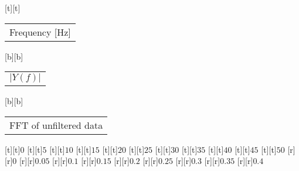 [t][t]{\fontsize{8}{12}\selectfont \setlength{\tabcolsep}{0pt}\begin{tabular}{c}Frequency [Hz]\end{tabular}}%
[b][b]{\fontsize{8}{12}\selectfont \setlength{\tabcolsep}{0pt}\begin{tabular}{c}$\vert{}Y(f)\vert$\end{tabular}}%
[b][b]{\fontsize{8}{12}\selectfont \setlength{\tabcolsep}{0pt}\begin{tabular}{c}FFT of unfiltered data\end{tabular}}%
%
\fontsize{6}{8}%
\selectfont%
%
[t][t]{$0$}%
[t][t]{$5$}%
[t][t]{$10$}%
[t][t]{$15$}%
[t][t]{$20$}%
[t][t]{$25$}%
[t][t]{$30$}%
[t][t]{$35$}%
[t][t]{$40$}%
[t][t]{$45$}%
[t][t]{$50$}%
%
[r][r]{$0$}%
[r][r]{$0.05$}%
[r][r]{$0.1$}%
[r][r]{$0.15$}%
[r][r]{$0.2$}%
[r][r]{$0.25$}%
[r][r]{$0.3$}%
[r][r]{$0.35$}%
[r][r]{$0.4$}%
%
